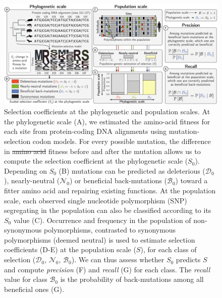 \documentclass{article}
\newcommand{\Sphy}{S_{0}}
\newcommand{\SphyDel}{\mathcal{D}_0}
\newcommand{\SphyNeu}{\mathcal{N}_0}
\newcommand{\SphyBen}{\mathcal{B}_0}
\newcommand{\Spop}{S}
\providecommand{\DIFaddtex}[1]{{\protect\color{blue}\uwave{#1}}} %
\providecommand{\DIFdeltex}[1]{{\protect\color{red}\sout{#1}}}                      %
\providecommand{\DIFaddFL}[1]{\DIFadd{#1}} %
\providecommand{\DIFdelFL}[1]{\DIFdel{#1}} %
\providecommand{\DIFaddbeginFL}{} %
\providecommand{\DIFaddendFL}{} %
\providecommand{\DIFdelbeginFL}{} %
\providecommand{\DIFdelendFL}{} %
\providecommand{\DIFadd}[1]{\texorpdfstring{\DIFaddtex{#1}}{#1}} %
\providecommand{\DIFdel}[1]{\texorpdfstring{\DIFdeltex{#1}}{}} %
\newcommand{\DIFscaledelfig}{0.5}
\newlength{\DIFdelgraphicswidth} %
\newlength{\DIFdelgraphicsheight} %
\newcommand{\DIFaddincludegraphics}[2][]{{\color{blue}\fbox{\DIFOincludegraphics[#1]{#2}}}} %
\newcommand{\DIFdelincludegraphics}[2][]{%
\sbox{\DIFdelgraphicsbox}{\DIFOincludegraphics[#1]{#2}}%
\settoboxwidth{\DIFdelgraphicswidth}{\DIFdelgraphicsbox} %
\settoboxtotalheight{\DIFdelgraphicsheight}{\DIFdelgraphicsbox} %
\scalebox{\DIFscaledelfig}{%
\parbox[b]{\DIFdelgraphicswidth}{\usebox{\DIFdelgraphicsbox}\\[-\baselineskip] \rule{\DIFdelgraphicswidth}{0em}}\llap{\resizebox{\DIFdelgraphicswidth}{\DIFdelgraphicsheight}{%
\setlength{\unitlength}{\DIFdelgraphicswidth}%
\begin{picture}(1,1)%
\thicklines\linethickness{2pt} %
{\color[rgb]{1,0,0}\put(0,0){\framebox(1,1){}}}%
{\color[rgb]{1,0,0}\put(0,0){\line( 1,1){1}}}%
{\color[rgb]{1,0,0}\put(0,1){\line(1,-1){1}}}%
\end{picture}%
}\hspace*{3pt}}} %
} %
\DeclareRobustCommand{\DIFaddbeginFL}{\DIFOaddbeginFL \let\includegraphics\DIFaddincludegraphics} %
\DeclareRobustCommand{\DIFaddendFL}{\DIFOaddendFL \let\includegraphics\DIFOincludegraphics} %
\DeclareRobustCommand{\DIFdelbeginFL}{\DIFOdelbeginFL \let\includegraphics\DIFdelincludegraphics} %
\DeclareRobustCommand{\DIFdelendFL}{\DIFOaddendFL \let\includegraphics\DIFOincludegraphics} %
\begin{document}
    \begin{figure}[!h]
        \centering
        \includegraphics[width=\textwidth, page=1] {artworks/figure.method.proba}
        \caption{
            Selection coefficients at the phylogenetic and population scales.
            At the phylogenetic scale (A), we estimated the amino-acid fitness for each site from protein-coding DNA alignments using mutation-selection codon models.
            For every possible mutation, the difference in \DIFdelbeginFL \DIFdelFL{amino acid }\DIFdelendFL \DIFaddbeginFL \DIFaddFL{amino-acid }\DIFaddendFL fitness before and after the mutation allows us to compute the selection coefficient at the phylogenetic scale ($\Sphy$).
            Depending on $\Sphy$ (B) mutations can be predicted as deleterious ($\SphyDel$), nearly-neutral ($\SphyNeu$) or beneficial back-mutations ($\SphyBen$) toward a fitter amino acid and repairing existing functions.
            At the population scale, each observed single nucleotide polymorphism (SNP) segregating in the population can also be classified according to its $\Sphy$ value (C).
            Occurrence and frequency in the population of non-synonymous polymorphisms, contrasted to synonymous polymorphisms (deemed neutral) is used to estimate selection coefficients (D-E) at the population scale ($\Spop$), for each class of selection ($\SphyDel$, $\SphyNeu$, $\SphyBen$).
            We can thus assess whether $\Sphy$ predicts $\Spop$ and compute \textit{precision} (F) and \textit{recall} (G) for each class.
            The \textit{recall} value for class $\SphyBen$ is the probability of back-mutations among all beneficial ones (G).
        }
        \label{fig:method}
    \end{figure}
\end{document}
